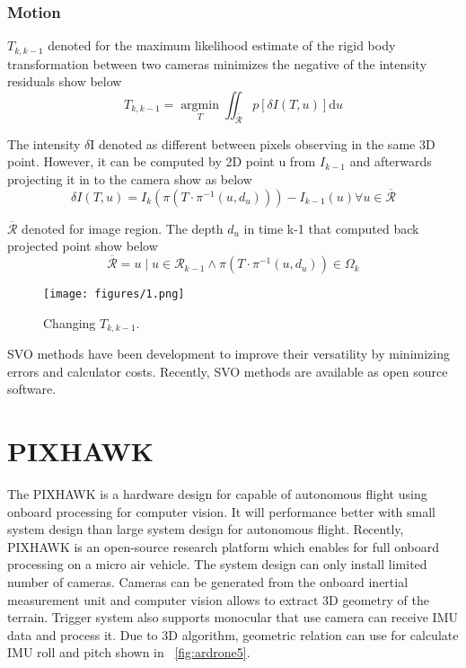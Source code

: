 \documentclass[12pt, a4paper]{aitthesis}
\begin{document}
\subsubsection{Motion}


$T_{k,k-1}$ denoted for the maximum likelihood estimate of the rigid body transformation between two cameras minimizes the negative of the intensity residuals show below
\[
    T_{k,k-1} = \operatorname*{argmin}_T  \iint_{\overline{\mathcal{R}}} p[\delta I(T,u)] \mathrm d u
\]

The intensity $\delta$I denoted as different between pixels observing in the same 3D point. However, it can be computed by 2D point u from $I_{k-1}$ and afterwards projecting it in to the camera show as below
\[
    \delta I(T,u) = I_{k} (\pi(T \cdot \pi^{-1}(u,d_{u}))) - I_{k-1}(u)\forall u \in \overline{\mathcal{R}}
\]

$\overline{\mathcal{R}}$ denoted for image region. The depth $d_{u}$ in time k-1 that computed back projected point show below
\[
    \overline{\mathcal{R}} = u\mid u \in \mathcal{R}_{k-1} \land \pi (T \cdot \pi^{-1}(u,d_{u})) \in \Omega_{k} 
\]

\begin{figure}[h]
\begin{center}
	\texttt{[image: figures/1.png]}
	\caption[Changing The Relative Pose]{Changing $T_{k,k-1}$.} \label{fig:timeline}
\end{center}
\end{figure}
\FloatBarrier
SVO methods have been development to improve their versatility by minimizing errors and calculator costs. Recently, SVO methods are available as open source software.

\section{PIXHAWK}

The PIXHAWK is a hardware design for capable of autonomous flight using onboard processing for computer vision. It will performance better with small system design than large system design for autonomous flight. Recently, PIXHAWK is an open-source research platform which enables for full onboard processing on a micro air vehicle. The system design can only install limited number of cameras. Cameras can be generated from the onboard inertial measurement unit and computer vision allows to extract 3D geometry of the terrain. Trigger system also supports monocular that use camera can receive IMU data and process it. Due to 3D algorithm, geometric relation can use for calculate IMU roll and pitch shown in \figurename~\ref{fig:ardrone5}. 
\end{document}
